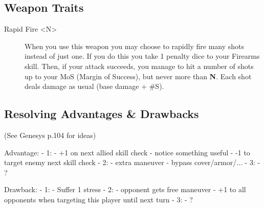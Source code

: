 \subsection{Weapon Traits}
{
    \setlength{\parskip}{0pt}  %
    \begin{description}
        \item[Rapid Fire <N>] 
        When you use this weapon you may choose to rapidly fire many shots instead of just one.
        If you do this you take 1 penalty dice to your Firearms skill. 
        Then, if your attack succeeds, you manage to hit a number of shots up to your MoS (Margin of Success), 
        but never more than \textbf{N}. 
        Each shot deals damage as usual (base damage + \#S).
    \end{description}
}



\subsection{Resolving Advantages \& Drawbacks}

(See Genesys p.104 for ideas)

Advantage:
    - 1:
        - +1 on next allied skill check
        - notice something useful
        - -1 to target enemy next skill check
    - 2:
        - extra maneuver
        - bypass cover/armor/...
    - 3:
        - ?

Drawback:
  - 1:
      - Suffer 1 stress
  - 2:
      - opponent gets free maneuver
      - +1 to all opponents when targeting this player until next turn
  - 3:
      - ?
  




